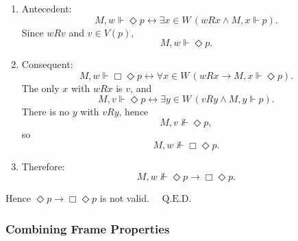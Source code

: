 \documentclass[12pt,a4paper,openany]{article}
\begin{document}
\begin{enumerate}
    \item Antecedent:
    $$M,w\Vdash\Diamond p
    \leftrightarrow \exists x\in W\,(wRx\land M,x\Vdash p).$$
    Since $wRv$ and $v\in V(p)$,
    $$M,w\Vdash\Diamond p.$$
    
    \item Consequent:
    $$M,w\Vdash\Box\Diamond p
    \leftrightarrow \forall x\in W\,(wRx\to M,x\Vdash\Diamond p).$$
    The only $x$ with $wRx$ is $v$, and
    $$M,v\Vdash\Diamond p
    \leftrightarrow \exists y\in W\,(vRy\land M,y\Vdash p).$$
    There is no $y$ with $vRy$, hence
    $$M,v\not\Vdash\Diamond p,$$
    so
    $$M,w\not\Vdash\Box\Diamond p.$$
    
    \item Therefore:
    $$M,w\not\Vdash \Diamond p \to \Box\Diamond p.$$
\end{enumerate}

Hence $\Diamond p \to \Box\Diamond p$ is not valid. $\quad \text{Q.E.D.}$

\begin{center}
\end{center}

\subsubsection{Combining Frame Properties}
\end{document}
